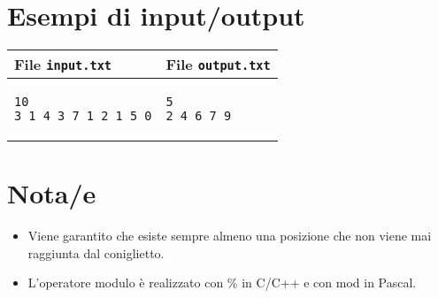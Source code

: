 \documentclass[a4paper,11pt]{article}
\begin{document}
\section*{Esempi di input/output}
    \noindent
    \begin{tabular}{p{11cm}|p{5cm}}
    \toprule
    \textbf{File \texttt{input.txt}}
    & \textbf{File \texttt{output.txt}}
    \\
    \midrule
    \scriptsize
    \begin{verbatim}
10
3 1 4 3 7 1 2 1 5 0
\end{verbatim}
    &
    \scriptsize
    \begin{verbatim}
5
2 4 6 7 9
\end{verbatim}
    \\
    \bottomrule
    \end{tabular}

\section*{Nota/e}
\begin{itemize}
  \item Viene garantito che esiste sempre almeno una posizione che non viene mai raggiunta dal coniglietto.
  \item L'operatore modulo è realizzato con \% in C/C++ e con mod in Pascal.
\end{itemize}
\end{document}
